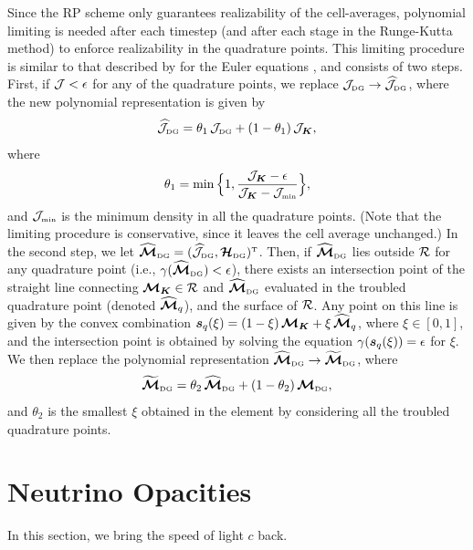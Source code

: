 \documentclass[10pt,preprint]{aastex}
\begin{document}
Since the RP scheme only guarantees realizability of the cell-averages, polynomial limiting is needed after each timestep (and after each stage in the Runge-Kutta method) to enforce realizability in the quadrature points.  
This limiting procedure is similar to that described by \citet{ZS2010a} for the Euler equations \citep[see also][]{liuOsher_1996}, and consists of two steps.  
First, if $\mathcal{J}<\epsilon$ for any of the quadrature points, we replace $\mathcal{J}_{\mbox{\tiny DG}}\to\widehat{\mathcal{J}}_{\mbox{\tiny DG}}$, where the new polynomial representation is given by
\begin{equation}
  \widehat{\mathcal{J}}_{\mbox{\tiny DG}}=\theta_{1}\,\mathcal{J}_{\mbox{\tiny DG}}+(1-\theta_{1})\,\mathcal{J}_{\boldsymbol{K}},
\end{equation}
where
\begin{equation}
  \theta_{1}=\min\Big\{1,\frac{\mathcal{J}_{\boldsymbol{K}}-\epsilon}{\mathcal{J}_{\boldsymbol{K}}-\mathcal{J}_{\mbox{\tiny min}}}\Big\},
\end{equation}
and $\mathcal{J}_{\mbox{\tiny min}}$ is the minimum density in all the quadrature points.  
(Note that the limiting procedure is conservative, since it leaves the cell average unchanged.)  
In the second step, we let $\widehat{\boldsymbol{\mathcal{M}}}_{\mbox{\tiny DG}}=(\widehat{\mathcal{J}}_{\mbox{\tiny DG}},\boldsymbol{\mathcal{H}}_{\mbox{\tiny DG}})^{\mbox{\tiny T}}$.  
Then, if $\widehat{\boldsymbol{\mathcal{M}}}_{\mbox{\tiny DG}}$ lies outside $\mathcal{R}$ for any quadrature point (i.e., $\gamma(\widehat{\boldsymbol{\mathcal{M}}}_{\mbox{\tiny DG}})<\epsilon$), there exists an intersection point of the straight line connecting $\boldsymbol{\mathcal{M}}_{\boldsymbol{K}}\in\mathcal{R}$ and $\widehat{\boldsymbol{\mathcal{M}}}_{\mbox{\tiny DG}}$ evaluated in the troubled quadrature point (denoted $\widehat{\boldsymbol{\mathcal{M}}}_{q}$), and the surface of $\mathcal{R}$.  
Any point on this line is given by the convex combination $\boldsymbol{s}_{q}(\xi)=(1-\xi)\,\boldsymbol{\mathcal{M}}_{\boldsymbol{K}}+\xi\,\widehat{\boldsymbol{\mathcal{M}}}_{q}$, where $\xi\in[0,1]$, and the intersection point is obtained by solving the equation $\gamma(\boldsymbol{s}_{q}(\xi))=\epsilon$ for $\xi$.  
We then replace the polynomial representation $\widehat{\boldsymbol{\mathcal{M}}}_{\mbox{\tiny DG}}\to\widetilde{\boldsymbol{\mathcal{M}}}_{\mbox{\tiny DG}}$, where
\begin{equation}
  \widetilde{\boldsymbol{\mathcal{M}}}_{\mbox{\tiny DG}}=\theta_{2}\,\widehat{\boldsymbol{\mathcal{M}}}_{\mbox{\tiny DG}}+(1-\theta_{2})\,\boldsymbol{\mathcal{M}}_{\mbox{\tiny DG}},
\end{equation}
and $\theta_{2}$ is the smallest $\xi$ obtained in the element by considering all the troubled quadrature points.  

\section{Neutrino Opacities}
\label{sec:opacities}

In this section, we bring the speed of light $c$ back.
\end{document}
